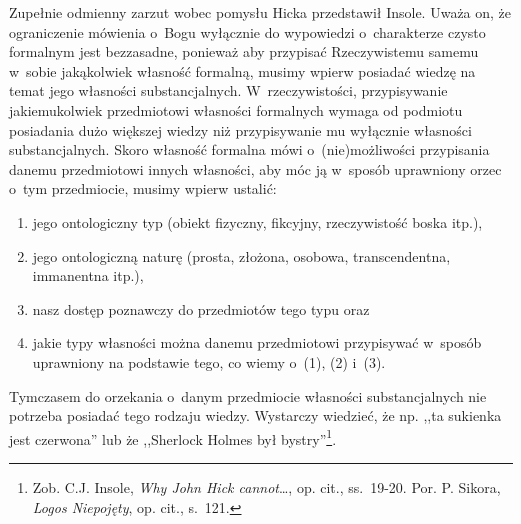 Zupełnie odmienny zarzut wobec pomysłu Hicka przedstawił Insole. Uważa on, że ograniczenie mówienia o~Bogu wyłącznie do wypowiedzi o~charakterze czysto formalnym jest bezzasadne, ponieważ aby przypisać Rzeczywistemu samemu w~sobie jakąkolwiek własność formalną, musimy wpierw posiadać wiedzę na temat jego własności substancjalnych. W~rzeczywistości, przypisywanie jakiemukolwiek przedmiotowi własności formalnych wymaga od podmiotu posiadania dużo większej wiedzy niż przypisywanie mu wyłącznie własności substancjalnych. Skoro własność formalna mówi o~(nie)możliwości przypisania danemu przedmiotowi innych własności, aby móc ją w~sposób uprawniony orzec o~tym przedmiocie, musimy wpierw ustalić:

\begin{enumerate}[label = (\arabic*)]
\item jego ontologiczny typ (obiekt fizyczny, fikcyjny, rzeczywistość boska itp.),
\item jego ontologiczną naturę (prosta, złożona, osobowa, transcendentna, immanentna itp.),
\item nasz dostęp poznawczy do przedmiotów tego typu oraz
\item jakie typy własności można danemu przedmiotowi przypisywać w~sposób uprawniony na podstawie tego, co wiemy o~(1), (2) i~(3).
\end{enumerate}
Tymczasem do orzekania o~danym przedmiocie własności substancjalnych nie potrzeba posiadać tego rodzaju wiedzy. Wystarczy wiedzieć, że np. ,,ta sukienka jest czerwona'' lub że ,,Sherlock Holmes był bystry''\footnote{Zob. C.J. Insole, \textit{Why John Hick cannot}\ldots, op. cit., ss.~19-20. Por. P. Sikora, \textit{Logos Niepojęty}, op. cit., s.~121.}.

